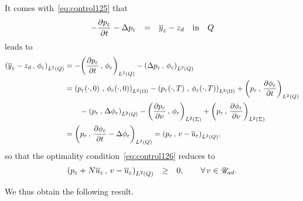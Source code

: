 It comes with~\eqref{eq:control125} that
\begin{equation*}
    \begin{array}{rclll}
        -\dfrac{\partial{}p_{\varepsilon}}{\partial{}t} - \Delta p_{\varepsilon} & = & {\overline{y}}_{\varepsilon} - z_{d}
        & \text{in} & Q
    \end{array}
\end{equation*}
leads to
\begin{equation*}
    \begin{split}
         \scalaireq{%
            \bareps{y} - z_{d}
        }{%
            \fieps{}
        } & = -\scalaireq{%
            \primetemps{p_{\veps}}
        }{%
            \fieps{}
        } - \scalaireq{%
            \Delta p_{\veps}
        }{%
            \fieps{}
        }\\
        & = \scalaireohm{%
            \condinitiale{p_{\veps}}
        }{%
            \condinitiale{\fieps}
        } - \scalaireohm{%
            \condfinale{p_{\veps}}
        }{%
            \condfinale{\fieps}
        } + \scalaireq{%
            p_{\veps}
        }{%
            \primetemps{\fieps}
        }\\
        &\qquad - \scalaireq{%
            p_{\veps}
        }{%
            \Delta\fieps{}
        } - \scalaires{%
            \deriveenormale{p_{\veps}}
        }{%
            \fieps{}
        } + \scalaires{%
            p_{\veps}
        }{%
            \deriveenormale{\fieps}
        }\\
        & = \scalaireq{%
            p_{\veps}
        }{%
            \primetemps{\fieps} - \Delta\fieps{}
        } = \scalaireq{%
            p_{\veps}
        }{%
            v - \bareps{u}
        },
    \end{split}
\end{equation*}
so that the optimality condition~\eqref{eq:control126} reduces to
\begin{equation*}
    \begin{array}{rcl}
        \scalaireq{%
            p_{\veps} + N\bareps{u}
        }{%
            v - \bareps{u}
        } & \geq & 0,\qquad \forall\,v\in\uad.
    \end{array}
\end{equation*}

We thus obtain the following result.

